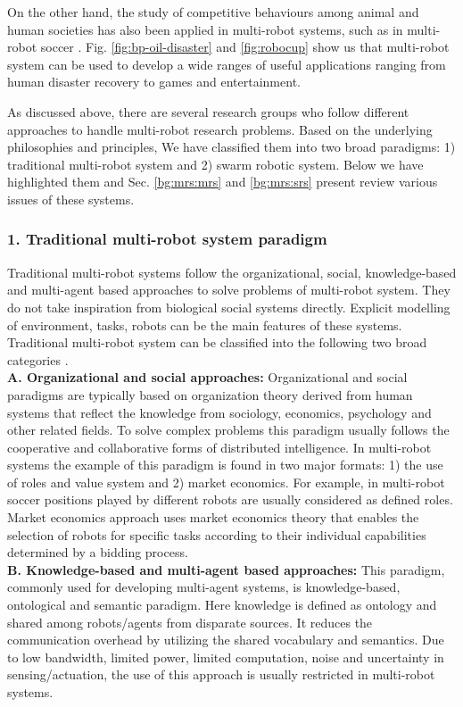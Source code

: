 On the other hand, the study of competitive behaviours among animal and human societies has also been applied in multi-robot systems, such as in multi-robot soccer \cite{Asada+1999}. Fig. \ref{fig:bp-oil-disaster} and \ref{fig:robocup} show us that multi-robot system can be used to develop a wide ranges of useful applications ranging from human disaster recovery to games and entertainment.

As discussed above, there are several research groups who follow different approaches to handle multi-robot research problems. Based on the underlying philosophies and principles, We have classified them into two broad paradigms: 1) traditional multi-robot system and 2) swarm robotic system. Below we have highlighted them  and Sec. \ref{bg:mrs:mrs} and \ref{bg:mrs:srs} present review various issues of these systems. 
%
\subsubsection*{1. Traditional multi-robot system paradigm}
Traditional multi-robot systems follow the organizational, social, knowledge-based and multi-agent based approaches to solve problems of multi-robot system. They do not take inspiration from biological social systems directly. Explicit modelling of environment, tasks, robots can be the main features of these systems. Traditional multi-robot system can be classified into the following two broad categories \cite{Parker2008}.\\
\textbf{A. Organizational and social approaches: }
Organizational and social paradigms are typically based on organization theory derived from human systems that reflect the knowledge from sociology, economics, psychology and other related fields. To solve complex problems this paradigm usually follows the cooperative and collaborative forms of distributed intelligence. In multi-robot systems the example of this paradigm is found in two major formats: 1) the use of roles and value system and 2) market economics.  For example, in multi-robot soccer \cite{Stone+1999} positions played by different robots are usually considered as defined roles. Market economics approach \cite{Dias+2006} uses market economics theory that enables the selection of robots for specific tasks according to their individual capabilities determined by a bidding process.\\
\textbf{B. Knowledge-based and multi-agent based approaches: }
This paradigm, commonly used for developing multi-agent systems, is knowledge-based, ontological and semantic paradigm. Here knowledge is defined as ontology and shared among robots/agents from disparate sources. It reduces the communication overhead by utilizing the shared vocabulary and semantics. Due to low bandwidth, limited power, limited computation, noise and uncertainty in sensing/actuation, the use of this approach is usually restricted in multi-robot systems.
% 
